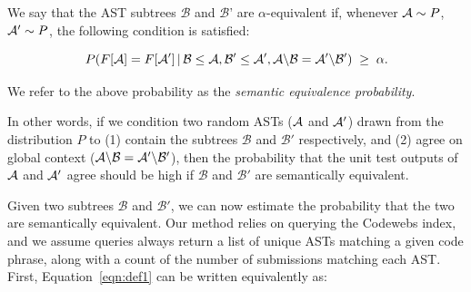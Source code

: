 \vspace{3mm}
\begin{defo}
	\label{def:equivalence}
	We say that the AST subtrees $\mathcal{B}$ and $\mathcal{B}$' are $\alpha$-equivalent if, whenever $\mathcal{A}\sim P$, $\mathcal{A}'\sim P$, the following condition is satisfied:

	\vspace{-2mm}
	{
	\begin{equation}\label{eqn:def1}
	P(F[\mathcal{A}] = F[\mathcal{A}'] \,|\, \mathcal{B}\leq \mathcal{A}, \mathcal{B}' \leq \mathcal{A}', \mathcal{A}\backslash \mathcal{B} = \mathcal{A}'\backslash \mathcal{B}') \;\geq\; \alpha.
	\end{equation}
	}
	\vspace{-2mm}

	We refer to the above probability as the \emph{semantic equivalence probability}.
\end{defo}
\vspace{3mm}

In other words, if we condition two random ASTs  ($\mathcal{A}$ and $\mathcal{A}'$) drawn from the distribution $P$ to (1) contain the subtrees
$\mathcal{B}$ and $\mathcal{B}'$ respectively, and (2) agree on global context ($\mathcal{A}\backslash \mathcal{B}=\mathcal{A}'\backslash \mathcal{B}'$), 
then the probability that the unit
test outputs of $\mathcal{A}$ and $\mathcal{A}'$ agree should be high if $\mathcal{B}$ and $\mathcal{B}'$ are semantically equivalent.




Given two subtrees $\mathcal{B}$ and $\mathcal{B}'$, we can now estimate the probability
that the two are semantically equivalent.   Our method relies on querying the Codewebs index, and 
we assume queries always return a list of unique ASTs matching a given code phrase, along with a count of the number of submissions 
matching each AST.
First, Equation~\ref{eqn:def1} can be written equivalently as:

